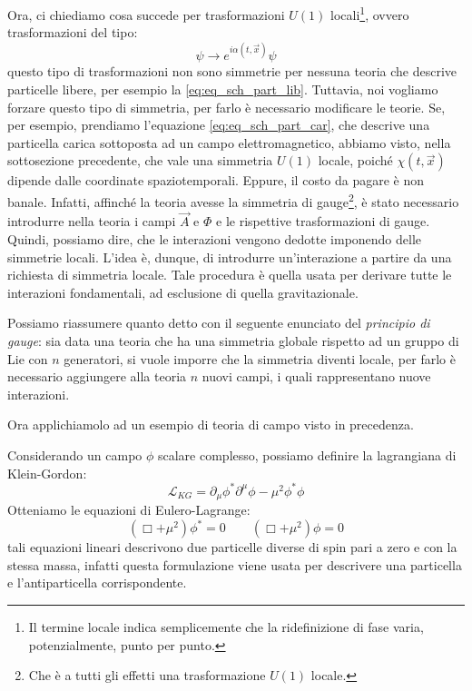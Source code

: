 Ora, ci chiediamo cosa succede per trasformazioni $U(1)$ locali\footnote{Il termine locale indica semplicemente che la ridefinizione di fase varia, potenzialmente, punto per punto.}, ovvero trasformazioni del tipo:
\begin{equation}
    \psi\xrightarrow{}e^{i\alpha(t,\Vec{x})}\psi
\end{equation}
questo tipo di trasformazioni non sono simmetrie per nessuna teoria che descrive particelle libere, per esempio la \eqref{eq:eq_sch_part_lib}. Tuttavia, noi vogliamo forzare questo tipo di simmetria, per farlo è necessario modificare le teorie. Se, per esempio, prendiamo l'equazione \eqref{eq:eq_sch_part_car}, che descrive una particella carica sottoposta ad un campo elettromagnetico, abbiamo visto, nella sottosezione precedente, che vale una simmetria $U(1)$ locale, poiché $\chi(t,\Vec{x})$ dipende dalle coordinate spaziotemporali. Eppure, il costo da pagare è non banale. Infatti, affinché la teoria avesse la simmetria di gauge\footnote{Che è a tutti gli effetti una trasformazione $U(1)$ locale.}, è stato necessario introdurre nella teoria i campi $\Vec{A}$ e $\Phi$ e le rispettive trasformazioni di gauge. Quindi, possiamo dire, che le interazioni vengono dedotte imponendo delle simmetrie locali. L'idea è, dunque, di introdurre un'interazione a partire da una richiesta di simmetria locale. Tale procedura è quella usata per derivare tutte le interazioni fondamentali, ad esclusione di quella gravitazionale.

Possiamo riassumere quanto detto con il seguente enunciato del \textit{principio di gauge}: sia data una teoria che ha una simmetria globale rispetto ad un gruppo di Lie con $n$ generatori, si vuole imporre che la simmetria diventi locale, per farlo è necessario aggiungere alla teoria $n$ nuovi campi, i quali rappresentano nuove interazioni.

Ora applichiamolo ad un esempio di teoria di campo visto in precedenza.

Considerando un campo $\phi$ scalare complesso, possiamo definire la lagrangiana di Klein-Gordon:
\begin{equation}
  \mathcal{L}_{KG}=\partial_\mu\phi^*\partial^\mu\phi-\mu^2\phi^*\phi
\end{equation}
Otteniamo le equazioni di Eulero-Lagrange:
\begin{equation}
  (\Box+\mu^2)\phi^*=0 \qquad (\Box+\mu^2)\phi=0 
\end{equation}
tali equazioni lineari descrivono due particelle diverse di spin pari a zero e con la stessa massa, infatti questa formulazione viene usata per descrivere una particella e l'antiparticella corrispondente.

